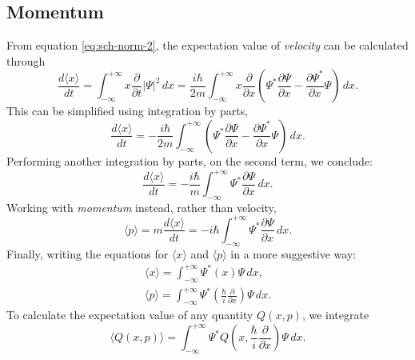 \documentclass{article}
\begin{document}
\subsection{Momentum}

From equation \eqref{eq:sch-norm-2}, the expectation value of \emph{velocity}
can be calculated through \begin{equation}
  \frac{d\langle x \rangle}{dt}
  = \int_{-\infty}^{+\infty} x\frac{\partial}{\partial t}|\Psi|^2 \,dx
  = \frac{i\hbar}{2m} \int_{-\infty}^{+\infty} x\frac{\partial}{\partial x}
  \left(
    \Psi^*\frac{\partial \Psi}{\partial x} - \frac{\partial \Psi^*}{\partial x}
    \Psi
  \right) \,dx. \label{eq:sch-mom-1}
\end{equation} This can be simplified using integration by parts,
\begin{equation}
  \frac{d\langle x \rangle}{dt}
  = -\frac{i\hbar}{2m} \int_{-\infty}^{+\infty} \left(
    \Psi^*\frac{\partial \Psi}{\partial x} - \frac{\partial \Psi^*}{\partial x}
    \Psi
  \right) \,dx. \label{eq:sch-mom-2}
\end{equation} Performing another integration by parts, on the second term, we
conclude: \begin{equation}
  \frac{d\langle x \rangle}{dt}
  = -\frac{i\hbar}{m} \int_{-\infty}^{+\infty} \Psi^*
  \frac{\partial \Psi}{\partial x} \,dx. \label{eq:sch-mom-3}
\end{equation} Working with \emph{momentum} instead, rather than velocity,
\begin{equation}
  \langle p \rangle
  = m\frac{d \langle x \rangle}{dt}
  = -i\hbar\int_{-\infty}^{+\infty} \Psi^*
  \frac{\partial \Psi}{\partial x} \,dx. \label{eq:sch-mom-4}
\end{equation} Finally, writing the equations for $\langle x \rangle$ and
$\langle p \rangle$ in a more suggestive way: \begin{gather}
  \langle x \rangle = \int_{-\infty}^{+\infty}
    \Psi^*(x)\Psi
  \,dx, \label{eq:sch-vel} \\
  \langle p \rangle = \int_{-\infty}^{+\infty} \Psi^* \left(
    \frac{\hbar}{i}\frac{\partial}{\partial x}
  \right)\Psi \,dx. \label{eq:sch-mom}
\end{gather} To calculate the expectation value of any quantity $Q(x, p)$, we
integrate \begin{equation}
  \langle Q(x, p) \rangle = \int_{-\infty}^{+\infty}
    \Psi^*Q\left(x, \frac{\hbar}{i}\frac{\partial}{\partial x}\right)\Psi
  \,dx. \label{eq:sch-qty}
\end{equation}
\end{document}
